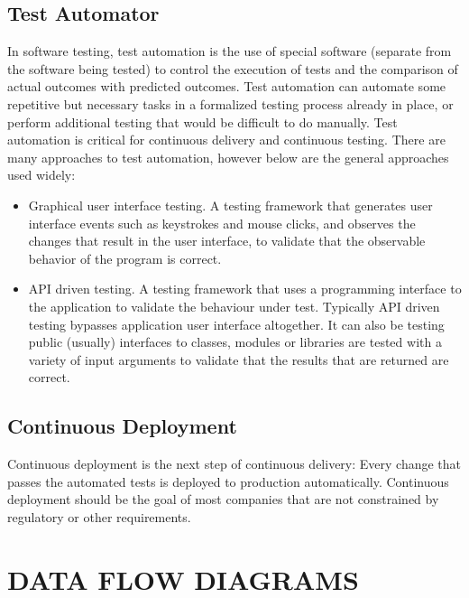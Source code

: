 \documentclass[12pt,a4paper,oneside]{report}
\begin{document}
{ 
\subsection{Test Automator}
\par In software testing, test automation is the use of special software (separate from the software being tested) to control the execution of tests and the comparison of actual outcomes with predicted outcomes. Test automation can automate some repetitive but necessary tasks in a formalized testing process already in place, or perform additional testing that would be difficult to do manually. Test automation is critical for continuous delivery and continuous testing. There are many approaches to test automation, however below are the general approaches used widely:

\begin{itemize}
\item Graphical user interface testing. A testing framework that generates user interface events such as keystrokes and mouse clicks, and observes the changes that result in the user interface, to validate that the observable behavior of the program is correct.
\item API driven testing. A testing framework that uses a programming interface to the application to validate the behaviour under test. Typically API driven testing bypasses application user interface altogether. It can also be testing public (usually) interfaces to classes, modules or libraries are tested with a variety of input arguments to validate that the results that are returned are correct.
\end{itemize}


\subsection{Continuous Deployment}
\par Continuous deployment is the next step of continuous delivery: Every change that passes the automated tests is deployed to production automatically. Continuous deployment should be the goal of most companies that are not constrained by regulatory or other requirements.


\newpage
\section{DATA FLOW DIAGRAMS}
}
\end{document}
